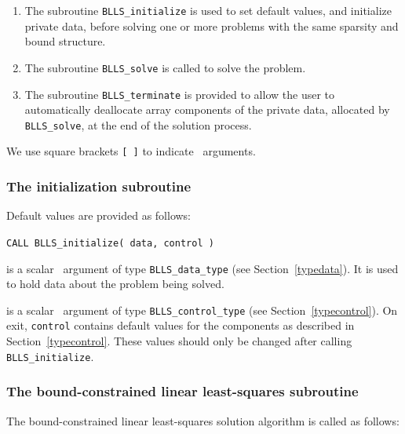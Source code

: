 \documentclass{galahad}
\newcommand{\packagename}{BLLS}
\begin{document}
\begin{enumerate}
\item The subroutine
      {\tt \packagename\_initialize}
      is used to set default values, and initialize private data,
      before solving one or more problems with the
      same sparsity and bound structure.
\item The subroutine
      {\tt \packagename\_solve}
      is called to solve the problem.
\item The subroutine
      {\tt \packagename\_terminate}
      is provided to allow the user to automatically deallocate array
       components of the private data, allocated by
       {\tt \packagename\_solve},
       at the end of the solution process.
\end{enumerate}
We use square brackets {\tt [ ]} to indicate \optional\ arguments.


\subsubsection{The initialization subroutine}\label{subinit}
 Default values are provided as follows:
\vspace*{1mm}

\hspace{8mm}
{\tt CALL \packagename\_initialize( data, control )}

\vspace*{-3mm}
\begin{description}

 is a scalar \intentinout\ argument of type
{\tt \packagename\_data\_type}
(see Section~\ref{typedata}). It is used to hold data about the problem being
solved.

 is a scalar \intentout\ argument of type
{\tt \packagename\_control\_type}
(see Section~\ref{typecontrol}).
On exit, {\tt control} contains default values for the components as
described in Section~\ref{typecontrol}.
These values should only be changed after calling
{\tt \packagename\_initialize}.

\end{description}


\subsubsection{The bound-constrained linear least-squares subroutine}\label{qps}
The bound-constrained linear least-squares solution algorithm is called
as follows:
\vspace*{1mm}
\end{document}
